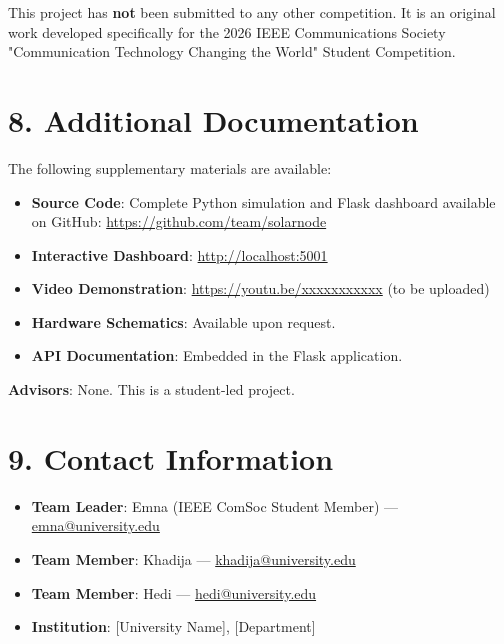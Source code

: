 \documentclass[12pt,a4paper]{article}
\begin{document}
This project has \textbf{not} been submitted to any other competition. It is an original work developed specifically for the 2026 IEEE Communications Society "Communication Technology Changing the World" Student Competition.

\section*{8. Additional Documentation}

The following supplementary materials are available:

\begin{itemize}
    \item \textbf{Source Code}: Complete Python simulation and Flask dashboard available on GitHub: \url{https://github.com/team/solarnode}
    \item \textbf{Interactive Dashboard}: \url{http://localhost:5001}
    \item \textbf{Video Demonstration}: \url{https://youtu.be/xxxxxxxxxxx} (to be uploaded)
    \item \textbf{Hardware Schematics}: Available upon request.
    \item \textbf{API Documentation}: Embedded in the Flask application.
\end{itemize}

\textbf{Advisors}: None. This is a student-led project.

\section*{9. Contact Information}

\begin{itemize}
    \item \textbf{Team Leader}: Emna (IEEE ComSoc Student Member) — \href{mailto:emna@university.edu}{emna@university.edu}
    \item \textbf{Team Member}: Khadija — \href{mailto:khadija@university.edu}{khadija@university.edu}
    \item \textbf{Team Member}: Hedi — \href{mailto:hedi@university.edu}{hedi@university.edu}
    \item \textbf{Institution}: [University Name], [Department]
\end{itemize}

\end{document}
